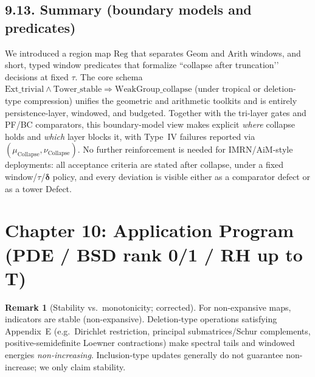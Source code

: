 \documentclass[11pt]{article}
\numberwithin{equation}{section}
\theoremstyle{plain}
\theoremstyle{definition}
\theoremstyle{remark}
\DeclareRobustCommand{\hyp}{\nobreakdash-}
\theoremstyle{plain}
\theoremstyle{definition}
\numberwithin{equation}{section}
\theoremstyle{definition}
\newtheorem{remark}[theorem]{Remark}
\DeclareRobustCommand{\muc}{\mu_{\mathrm{Collapse}}}
\DeclareRobustCommand{\nuc}{\nu_{\mathrm{Collapse}}}
\numberwithin{equation}{section}
\theoremstyle{plain}
\theoremstyle{definition}
\theoremstyle{remark}
\providecommand{\muc}{\mu_{\mathrm{Collapse}}}
\providecommand{\nuc}{\nu_{\mathrm{Collapse}}}
\begin{document}
\subsection*{9.13. Summary (boundary models and predicates)}
We introduced a region map \(\mathrm{Reg}\) that separates \(\mathrm{Geom}\) and \(\mathrm{Arith}\) windows, and short, typed window predicates that formalize “collapse after truncation’’ decisions at fixed \(\tau\). The core schema \(\mathrm{Ext\_trivial}\wedge\mathrm{Tower\_stable}\Rightarrow\mathrm{WeakGroup\_collapse}\) (under tropical or deletion\hyp type compression) unifies the geometric and arithmetic toolkits and is entirely persistence\hyp layer, windowed, and budgeted. Together with the tri\hyp layer gates and PF/BC comparators, this boundary\hyp model view makes explicit \emph{where} collapse holds and \emph{which} layer blocks it, with Type~IV failures reported via \((\muc,\nuc)\). No further reinforcement is needed for IMRN/AiM\hyp style deployments: all acceptance criteria are stated after collapse, under a fixed window/\(\tau\)/\(\boldsymbol{\delta}\) policy, and every deviation is visible either as a comparator defect or as a tower Defect.




\section{Chapter 10: Application Program (PDE / BSD rank 0/1 / RH up to T)}

\begin{remark}[Stability vs.\ monotonicity; corrected]
For non\hyp expansive maps, indicators are stable (non\hyp expansive).
Deletion\hyp type operations satisfying Appendix~E (e.g.\ Dirichlet restriction, principal submatrices/Schur complements, positive\hyp semidefinite Loewner contractions)
make spectral tails and windowed energies \emph{non\hyp increasing}.
Inclusion\hyp type updates generally do not guarantee non\hyp increase; we only claim stability.
\end{remark}
\end{document}
